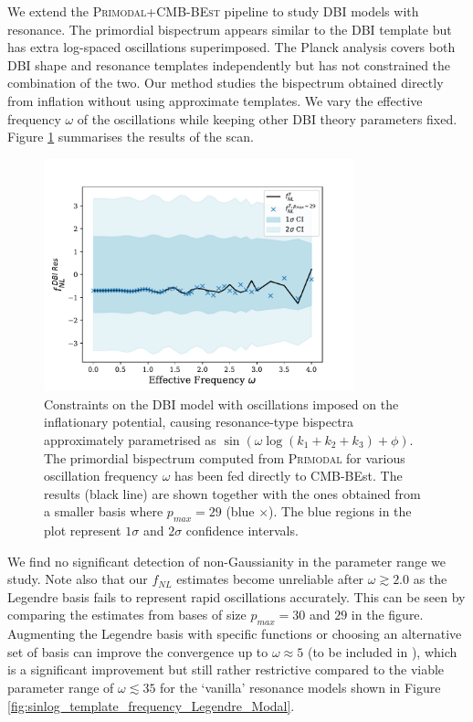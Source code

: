 \bigskip

We extend the \textsc{Primodal}+\textsc{CMB-BEst} pipeline to study DBI models with resonance. The primordial bispectrum appears similar to the DBI template but has extra log-spaced oscillations superimposed. The Planck analysis covers both DBI shape and resonance templates independently but has not constrained the combination of the two. Our method studies the bispectrum obtained directly from inflation without using approximate templates. We vary the effective frequency $\omega$ of the oscillations while keeping other DBI theory parameters fixed. Figure \ref{fig:dbi_resonance_scan} summarises the results of the scan.

\begin{figure}[htbp!] 
	\centering    
	\includegraphics[width=0.8\textwidth]{dbi_reso_scan_fNLs_new.pdf}
	\caption{Constraints on the DBI model with oscillations imposed on the inflationary potential, causing resonance-type bispectra approximately parametrised as $\sin(\omega \log(k_1+k_2+k_3) + \phi)$. The primordial bispectrum computed from \textsc{Primodal} for various oscillation frequency $\omega$ has been fed directly to CMB-BEst. The results (black line) are shown together with the ones obtained from a smaller basis where $p_{max}=29$ (blue $\times$). The blue regions in the plot represent $1\sigma$ and $2\sigma$ confidence intervals.}
	\label{fig:dbi_resonance_scan}
\end{figure}

We find no significant detection of non-Gaussianity in the parameter range we study. Note also that our $f_{NL}$ estimates become unreliable after $\omega\gtrsim2.0$ as the Legendre basis fails to represent rapid oscillations accurately. This can be seen by comparing the estimates from bases of size $p_{max}=30$ and $29$ in the figure. Augmenting the Legendre basis with specific functions or choosing an alternative set of basis \cite{Clarke2021} can improve the convergence up to $\omega\approx5$ (to be included in \cite{Sohn2021inprep}), which is a significant improvement but still rather restrictive compared to the viable parameter range of $\omega\lesssim 35$ for the `vanilla' resonance models shown in Figure \ref{fig:sinlog_template_frequency_Legendre_Modal}.

